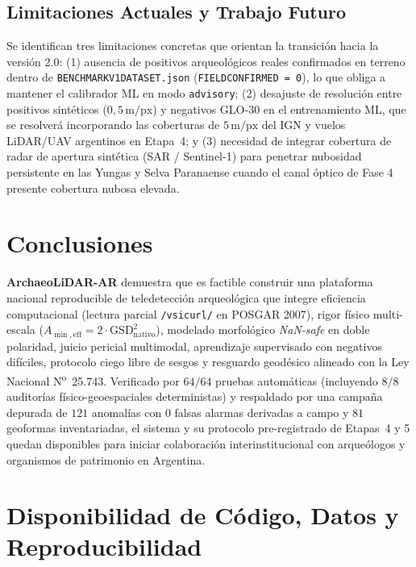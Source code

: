 \documentclass[11pt,a4paper]{article}
\DeclareRobustCommand{\_}{\ifmmode\mbox{\textunderscore}\else\textunderscore\allowbreak\fi}
\begin{document}
\subsection{Limitaciones Actuales y Trabajo Futuro}

Se identifican tres limitaciones concretas que orientan la transici\'on hacia la versi\'on 2.0: (1) ausencia de positivos arqueol\'ogicos reales confirmados en terreno dentro de \texttt{BENCHMARK\_V1\_DATASET.json} (\texttt{FIELD\_CONFIRMED = 0}), lo que obliga a mantener el calibrador ML en modo \texttt{advisory}; (2) desajuste de resoluci\'on entre positivos sint\'eticos ($0{,}5\,\mathrm{m/px}$) y negativos GLO-30 en el entrenamiento ML, que se resolver\'a incorporando las coberturas de $5\,\mathrm{m/px}$ del IGN y vuelos LiDAR/UAV argentinos en Etapa~4; y (3) necesidad de integrar cobertura de radar de apertura sint\'etica (SAR / Sentinel-1) para penetrar nubosidad persistente en las Yungas y Selva Paranaense cuando el canal \'optico de Fase 4 presente cobertura nubosa elevada.

\section{Conclusiones}

\textbf{ArchaeoLiDAR-AR} demuestra que es factible construir una plataforma nacional reproducible de teledetecci\'on arqueol\'ogica que integre eficiencia computacional (lectura parcial \texttt{/vsicurl/} en POSGAR 2007), rigor f\'isico multi-escala ($A_{\min,\mathrm{eff}} = 2\cdot\mathrm{GSD}_{\mathrm{nativo}}^2$), modelado morfol\'ogico \emph{NaN-safe} en doble polaridad, juicio pericial multimodal, aprendizaje supervisado con negativos dif\'iciles, protocolo ciego libre de sesgos y resguardo geod\'esico alineado con la Ley Nacional N\textsuperscript{o}~25.743. Verificado por $64/64$ pruebas autom\'aticas (incluyendo $8/8$ auditor\'ias f\'isico-geoespaciales deterministas) y respaldado por una campa\~na depurada de $121$ anomal\'ias con $0$ falsas alarmas derivadas a campo y $81$ geoformas inventariadas, el sistema y su protocolo pre-registrado de Etapas~4 y 5 quedan disponibles para iniciar colaboraci\'on interinstitucional con arque\'ologos y organismos de patrimonio en Argentina.

\FloatBarrier
\section*{Disponibilidad de C\'odigo, Datos y Reproducibilidad}
\end{document}
